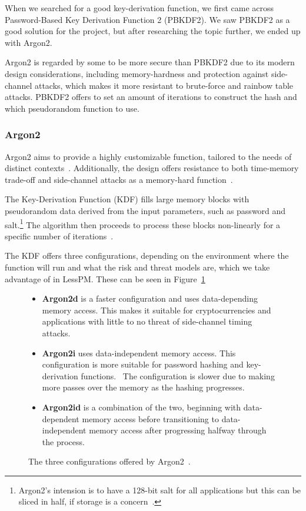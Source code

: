 
When we searched for a good key-derivation function, we first came across
Password-Based Key Derivation Function 2 (PBKDF2).
We saw PBKDF2 as a good solution for the project, but after researching the
topic further, we ended up with Argon2.

Argon2 is regarded by some to be more secure than PBKDF2 due to its modern
design considerations, including memory-hardness and protection against
side-channel attacks, which makes it more resistant to brute-force and rainbow
table attacks.
PBKDF2 offers to set an amount of iterations to construct the hash and which
pseudorandom function to use.

\subsubsection{Argon2}
Argon2 aims to provide a highly customizable function, tailored to the needs
of distinct contexts~\cite{argon2specs}.
Additionally, the design offers resistance to both time-memory trade-off
and side-channel attacks as a memory-hard function~\cite{argon2specs}.

The Key-Derivation Function (KDF) fills large memory blocks with pseudorandom
data derived from the input parameters, such as password and salt.\footnote{
  Argon2's intension is to have a 128-bit salt for all applications but this
  can be sliced in half, if storage is a concern~\cite{argon2specs}.
}
The algorithm then proceeds to process these blocks non-linearly for a specific
number of iterations~\cite{argon2specs}.

The KDF offers three configurations, depending on the environment where
the function will run and what the risk and threat models are, which we take
advantage of in LessPM\@.
These can be seen in Figure~\ref{fig:argon2conf}

\begin{figure}[htbp]
  \centering
  \begin{itemize}
    \item \textbf{Argon2d} is a faster configuration and uses data-depending
    memory access.
    This makes it suitable for cryptocurrencies and applications with little to
    no threat of side-channel timing attacks.\protect\footnotemark
    \item \textbf{Argon2i} uses data-independent memory access.
    This configuration is more suitable for password hashing and key-derivation
    functions.\protect\footnotemark
    ~The configuration is slower due to making more passes over the memory as
    the hashing progresses.
    \item \textbf{Argon2id} is a combination of the two, beginning with
    data-dependent memory access before transitioning to data-independent
    memory access after progressing halfway through the process.
  \end{itemize}
  \caption{The three configurations offered by Argon2~\cite{argon2specs}.}
  \label{fig:argon2conf}
\end{figure}

